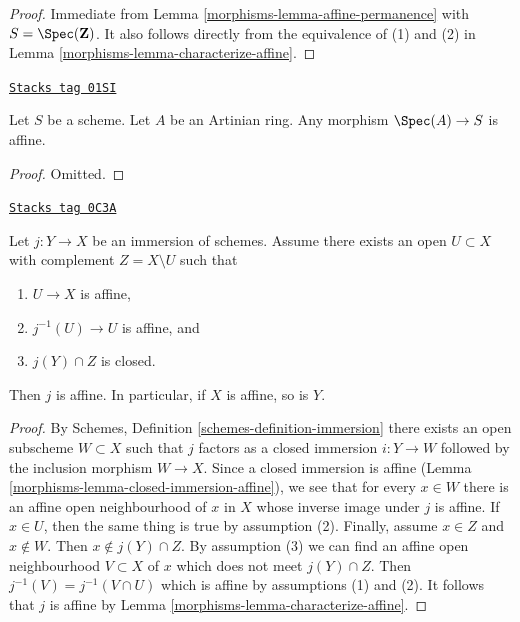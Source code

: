 \begin{proof}

Immediate from Lemma \ref{morphisms-lemma-affine-permanence} with
$S = \Spec(\mathbf{Z})$. It also follows directly from the
equivalence of (1) and (2) in Lemma \ref{morphisms-lemma-characterize-affine}.
\end{proof}

\begin{lemma}
\label{morphisms-lemma-Artinian-affine}
\href{https://stacks.math.columbia.edu/tag/01SI}{\texttt{Stacks tag 01SI}}

Let $S$ be a scheme.
Let $A$ be an Artinian ring.
Any morphism $\Spec(A) \to S$ is affine.
\end{lemma}

\begin{proof}
Omitted.
\end{proof}

\begin{lemma}
\label{morphisms-lemma-get-affine}
\href{https://stacks.math.columbia.edu/tag/0C3A}{\texttt{Stacks tag 0C3A}}

Let $j : Y \to X$ be an immersion of schemes.
Assume there exists an open $U \subset X$ with complement
$Z = X \setminus U$ such that
\begin{enumerate}
\item $U \to X$ is affine,
\item $j^{-1}(U) \to U$ is affine, and
\item $j(Y) \cap Z$ is closed.
\end{enumerate}
Then $j$ is affine. In particular, if $X$ is affine, so is $Y$.
\end{lemma}

\begin{proof}

By Schemes, Definition \ref{schemes-definition-immersion} there exists an
open subscheme $W \subset X$ such that $j$ factors as a closed immersion
$i : Y \to W$ followed by the inclusion morphism $W \to X$.
Since a closed immersion is affine
(Lemma \ref{morphisms-lemma-closed-immersion-affine}),
we see that for every $x \in W$ there is an affine open
neighbourhood of $x$ in $X$ whose inverse image under $j$ is affine.
If $x \in U$, then the same thing is true by assumption (2).
Finally, assume $x \in Z$ and $x \not \in W$. Then $x \not \in j(Y) \cap Z$.
By assumption (3) we can find an affine open neighbourhood
$V \subset X$ of $x$ which does not meet $j(Y) \cap Z$.
Then $j^{-1}(V) = j^{-1}(V \cap U)$ which is affine
by assumptions (1) and (2). It follows that $j$ is affine by
Lemma \ref{morphisms-lemma-characterize-affine}.
\end{proof}

